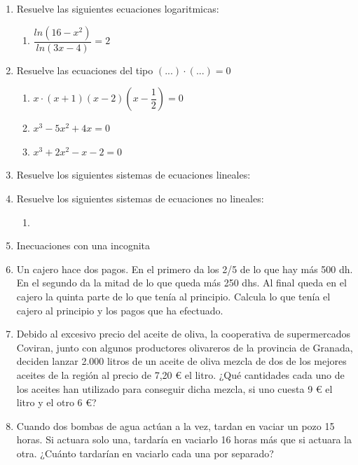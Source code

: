 \documentclass[11pt,a4paper]{article}
\begin{document}
\begin{enumerate}
\begin{enumerate}
            \item $3^x-3^{x-1}+3^{x-2}=21$
            \item $9^x-2 \cdot 3^{x+2}+81=0$
        \end{enumerate}
    \item Resuelve las siguientes ecuaciones logaritmicas: 
        \begin{enumerate}
            \item $\dfrac{ln(16-x^2)}{ln(3x-4)}=2$
        \end{enumerate}
    \item Resuelve las ecuaciones del tipo $(...) \cdot (...) = 0$
        \begin{enumerate}
            \item $x \cdot (x+1)(x-2)\left(x - \dfrac{1}{2}\right) = 0$
            \item $x^3 - 5x^2 + 4x = 0$
            \item $x^3 + 2x^2 - x - 2 = 0$
        \end{enumerate}
    \item Resuelve los siguientes sistemas de ecuaciones lineales: 
    \item Resuelve los siguientes sistemas de ecuaciones no lineales:
        \begin{enumerate}
            \item %
        \end{enumerate}
    \item Inecuaciones con una incognita
    \item  Un cajero hace dos pagos. En el primero da los 2/5 de lo que hay más 500 dh. En el segundo da la mitad de lo que queda más 250 dhs. Al final queda en el cajero la quinta parte de lo que tenía al principio. Calcula lo que tenía el cajero al principio y los pagos que ha efectuado.
    \item Debido al excesivo precio del aceite de oliva, la cooperativa de supermercados Coviran, junto con algunos productores olivareros de la provincia de Granada, deciden lanzar 2.000 litros de un aceite de oliva mezcla de dos de los mejores aceites de la región al precio de 7,20 € el litro. ¿Qué cantidades cada uno de los aceites han utilizado para conseguir dicha mezcla, si uno cuesta 9 € el litro y el otro 6 €? 
    \item  Cuando dos bombas de agua actúan a la vez, tardan en vaciar un pozo 15 horas. Si actuara solo una, tardaría en vaciarlo 16 horas más que si actuara la otra. ¿Cuánto tardarían en vaciarlo cada una por separado?

\end{enumerate}
\end{document}
